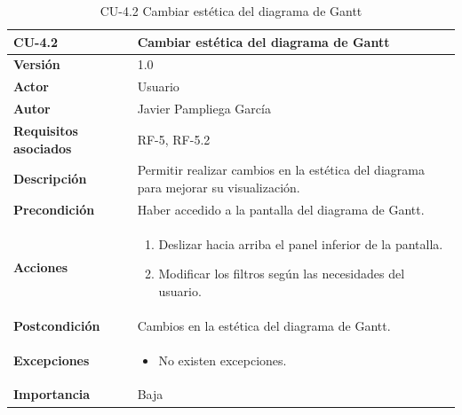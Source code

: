 \begin{table}[p]
	\centering
	\begin{tabularx}{\linewidth}{ p{} p{} }
		\toprule
		\textbf{CU-4.2}    & \textbf{Cambiar estética del diagrama de Gantt}\\
		\toprule
		\textbf{Versión}              & 1.0    \\
            \textbf{Actor}                & Usuario \\
		\textbf{Autor}                & Javier Pampliega García \\
		\textbf{Requisitos asociados} & RF-5, RF-5.2\\
		\textbf{Descripción}          & Permitir realizar cambios en la estética del diagrama para mejorar su visualización. \\
		\textbf{Precondición}         & Haber accedido a la pantalla del diagrama de Gantt. \\
		\textbf{Acciones}             &
		\begin{enumerate}
			\def\labelenumi{\arabic{enumi}.}
			\tightlist
			\item Deslizar hacia arriba el panel inferior de la pantalla.
                \item Modificar los filtros según las necesidades del usuario.
		\end{enumerate}\\
		\textbf{Postcondición}        & Cambios en la estética del diagrama de Gantt. \\
		\textbf{Excepciones}          & \begin{itemize}
		    \item No existen excepciones.
		\end{itemize} \\
		\textbf{Importancia}          & Baja \\
		\bottomrule
	\end{tabularx}
	\caption{CU-4.2 Cambiar estética del diagrama de Gantt}
\end{table}


